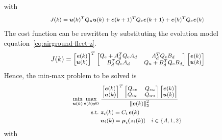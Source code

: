 \documentclass{ifacconf}
\begin{document}
with
\begin{equation}
    \footnotesize
    J(k) = \boldsymbol{u}(k)^TQ_u\boldsymbol{u}(k)+\boldsymbol{e}(k+1)^TQ_e\boldsymbol{e}(k+1)+\boldsymbol{e}(k)^TQ_e\boldsymbol{e}(k)   
\end{equation}
The cost function can be rewritten by substituting the evolution model 
equation~\eqref{eq:airground-fleet-z}.
\begin{equation}
\footnotesize
    J(k) = \begin{bmatrix}
        \boldsymbol{e}(k) \\ \boldsymbol{u}(k)
    \end{bmatrix}^T \begin{bmatrix}
        Q_e + A_d^T Q_e A_d & A_d^T Q_e B_d \\ 
        B_d^T Q_e A_d & Q_u + B_d^T Q_e B_d
    \end{bmatrix}\begin{bmatrix}
        \boldsymbol{e}(k) \\ \boldsymbol{u}(k)
    \end{bmatrix}
\end{equation}
Hence, the min-max problem to be solved is 
\begin{equation}
    \footnotesize
\begin{aligned}
    \min_{\boldsymbol{u}(k)} \max_{\boldsymbol{e}(k) \neq 0} \ & \frac{\begin{bmatrix}
        \boldsymbol{e}(k) \\ \boldsymbol{u}(k)
    \end{bmatrix}^T \begin{bmatrix}
        Q_{ee} & Q_{eu} \\
        Q_{ue} & Q_{uu}
    \end{bmatrix}\begin{bmatrix}
        \boldsymbol{e}(k) \\ \boldsymbol{u}(k)
    \end{bmatrix}}{\left\lVert \boldsymbol{e}(k)\right\rVert^2_2} \\
    \textrm{s.t.} \  &\boldsymbol{z}_i(k) = C_i \, \boldsymbol{e}(k) \\
    \quad & \boldsymbol{u}_{i}(k) = \boldsymbol{\mu}_i(\boldsymbol{z}_i(k)) \quad i \in \{A,1,2\} \\
\end{aligned}
\label{eq:minmax_v1}
\end{equation}
with
\vspace{-0.6cm}
\end{document}
